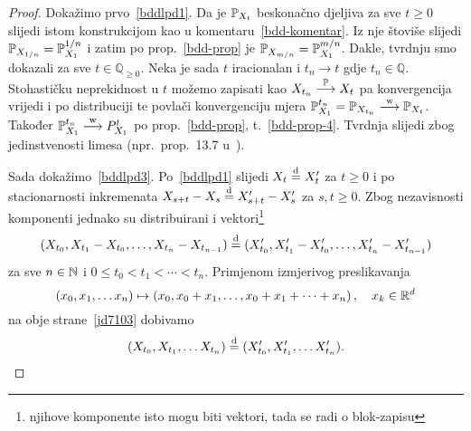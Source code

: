 \documentclass[main.tex]{subfiles}
\begin{document}
\begin{proof}
	Dokažimo prvo~\ref{bddlpd1}. Da je \( \P_{X_t} \) beskonačno djeljiva za sve \( t \geq 0 \) slijedi istom konstrukcijom kao u komentaru~\ref{bdd-komentar}. Iz nje štoviše slijedi
	\( \P_{X_{1/n}} = \P_{X_1}^{1/n} \) i zatim po prop.~\ref{bdd-prop} je  \( \P_{X_{m/n}} = \P_{X_1}^{m/n} \). Dakle, tvrdnju smo dokazali za sve \( t \in \mathbb Q_{\ge 0} \).
	Neka je sada \( t \) iracionalan i \( t_n \rightarrow t \) gdje \( t_n \in \mathbb Q \). Stohastičku neprekidnost u \( t \) možemo zapisati kao \( X_{t_n} \konvp X_{t} \) pa konvergencija vrijedi i po distribuciji
	te povlači konvergenciju mjera \( \P_{X_1}^{t_n} = \P_{X_{t_n}} \konvw \P_{X_t} \). Također \( \P_{X_1}^{t_n} \konvw P_{X_1}^t \) po prop.~\ref{bdd-prop}, t.~\ref{bdd-prop-4}. Tvrdnja slijedi zbog jedinstvenosti limesa (npr.\ prop.~13.7 u~\cite{sarapa}).

	Sada dokažimo~\ref{bddlpd3}. Po~\ref{bddlpd1} slijedi \( X_t \jpod X_t' \) za \( t \ge 0 \) i po stacionarnosti inkremenata \( X_{s+t}-X_s \jpod X_{s+t}'-X_s' \) za \( s, t \ge 0 \). Zbog nezavisnosti komponenti jednako su distribuirani i vektori\footnote{njihove komponente isto mogu biti vektori, tada se radi o blok-zapisu}
	\begin{equation} \label{jd7103}
		( X_{t_0}, X_{t_1}-X_{t_0}, \ldots, X_{t_n}-X_{t_{n-1}}  )
		\jpod
		( X_{t_0}', X_{t_1}'-X_{t_0}', \ldots, X_{t_n}'-X_{t_{n-1}}'  )
	\end{equation}
	za sve \( n \in \N \) i \( 0 \le t_0 < t_1 < \cdots < t_n \). Primjenom
	izmjerivog preslikavanja
	\[
		\left( x_0, x_1, \ldots x_n \right) \mapsto \left( x_0, x_0 + x_1, \ldots, x_0 + x_1 + \cdots + x_n  \right), \quad x_k \in \R^d
	\]
	na obje strane~\eqref{jd7103} dobivamo
	\[
		( X_{t_0}, X_{t_1}, \ldots X_{t_n} )
		\jpod
		( X_{t_0}', X_{t_1}', \ldots X_{t_n}' ).
	\]


\end{proof}
\end{document}
